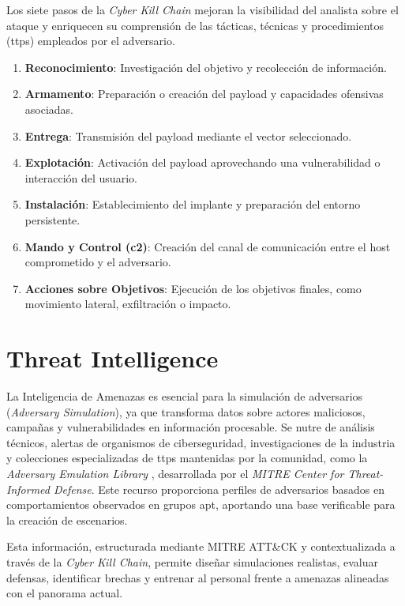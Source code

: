 Los siete pasos de la \textit{Cyber Kill Chain} mejoran la visibilidad del analista sobre el ataque y enriquecen su comprensión de las tácticas, técnicas y procedimientos (\acrshort{ttp}s) empleados por el adversario.

\begin{enumerate}
    \item \textbf{Reconocimiento}: Investigación del objetivo y recolección de información.
    \item \textbf{Armamento}: Preparación o creación del payload y capacidades ofensivas asociadas.
    \item \textbf{Entrega}: Transmisión del payload mediante el vector seleccionado.
    \item \textbf{Explotación}: Activación del payload aprovechando una vulnerabilidad o interacción del usuario.
    \item \textbf{Instalación}: Establecimiento del implante y preparación del entorno persistente.
    \item \textbf{Mando y Control (\acrshort{c2})}: Creación del canal de comunicación entre el host comprometido y el adversario.
    \item \textbf{Acciones sobre Objetivos}: Ejecución de los objetivos finales, como movimiento lateral, exfiltración o impacto.
\end{enumerate}

\section{Threat Intelligence}

La Inteligencia de Amenazas es esencial para la simulación de adversarios (\textit{Adversary Simulation}), ya que transforma datos sobre actores maliciosos, campañas y vulnerabilidades en información procesable. Se nutre de análisis técnicos, alertas de organismos de ciberseguridad, investigaciones de la industria y colecciones especializadas de \acrshort{ttp}s mantenidas por la comunidad, como la \textit{Adversary Emulation Library} \cite{mitreAEL}, desarrollada por el \textit{MITRE Center for Threat-Informed Defense}. Este recurso proporciona perfiles de adversarios basados en comportamientos observados en grupos \acrshort{apt}, aportando una base verificable para la creación de escenarios.

Esta información, estructurada mediante MITRE ATT\&CK y contextualizada a través de la \textit{Cyber Kill Chain}, permite diseñar simulaciones realistas, evaluar defensas, identificar brechas y entrenar al personal frente a amenazas alineadas con el panorama actual.

